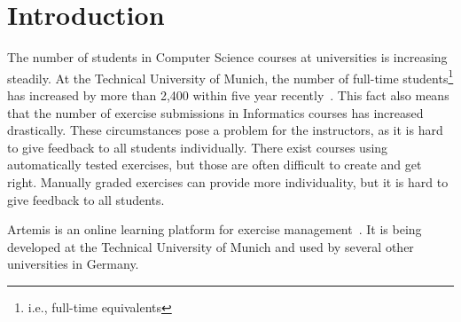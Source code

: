 
\def\proposal{Proposal for}

\usepackage[nolist]{acronym}
\usepackage{csquotes}


\setlength{\evensidemargin}{22pt}
\setlength{\oddsidemargin}{22pt}



\lstset{showspaces=false, numbers=left, frame=single, basicstyle=\small}




\fancyhead{}
\pagestyle{fancy}
\fancyhead[LE]{\slshape \leftmark}
\fancyhead[RO]{\slshape \rightmark}
\headheight=15pt

\section*{Introduction}

The number of students in Computer Science courses at universities is increasing steadily. At the Technical University of Munich, the number of full-time students\footnote{i.e., full-time equivalents} has increased by more than 2,400 within five year recently~\cite{tumInZahlen2020}. This fact also means that the number of exercise submissions in Informatics courses has increased drastically.
These circumstances pose a problem for the instructors, as it is hard to give feedback to all students individually. There exist courses using automatically tested exercises, but those are often difficult to create and get right. Manually graded exercises can provide more individuality, but it is hard to give feedback to all students.

Artemis is an online learning platform for exercise management~\cite{ArTEMiS}. It is being developed at the Technical University of Munich and used by several other universities in Germany. 

